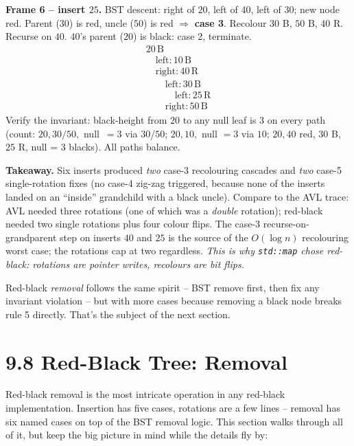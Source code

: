 \documentclass[11pt]{article}
\begin{document}
\begin{examplebox}
\textbf{Frame 6 -- insert $25$.} BST descent: right of $20$, left
of $40$, left of $30$; new node red. Parent ($30$) is red, uncle
($50$) is red $\Rightarrow$ \textbf{case 3}. Recolour $30$ B,
$50$ B, $40$ R. Recurse on $40$. $40$'s parent ($20$) is black:
case 2, terminate.
\[
\begin{array}{l}
20\,\text{B} \\
\quad \text{left}: 10\,\text{B} \\
\quad \text{right}: 40\,\text{R} \\
\qquad \text{left}: 30\,\text{B} \\
\qquad\quad \text{left}: 25\,\text{R} \\
\qquad \text{right}: 50\,\text{B}
\end{array}
\]
Verify the invariant: black-height from $20$ to any null leaf is
$3$ on every path (count: $20, 30/50, $ null $\,= 3$ via
$30$/$50$; $20, 10, $ null $ = 3$ via $10$; $20, 40$ red, $30$ B,
$25$ R, null = $3$ blacks). All paths balance.

\textbf{Takeaway.} Six inserts produced \emph{two} case-3
recolouring cascades and \emph{two} case-5 single-rotation fixes
(no case-4 zig-zag triggered, because none of the inserts landed
on an ``inside'' grandchild with a black uncle). Compare to the
AVL trace: AVL needed three rotations (one of which was a
\emph{double} rotation); red-black needed two single rotations
plus four colour flips. The case-3 recurse-on-grandparent step on
inserts $40$ and $25$ is the source of the $O(\log n)$ recolouring
worst case; the rotations cap at two regardless. \emph{This is
why \texttt{std::map} chose red-black: rotations are pointer
writes, recolours are bit flips.}
\end{examplebox}

\begin{notebox}
Red-black \emph{removal} follows the same spirit -- BST remove first, then fix any invariant violation -- but with more cases because removing a black node breaks rule 5 directly. That's the subject of the next section.
\end{notebox}

\section{9.8 Red-Black Tree: Removal}

Red-black removal is the most intricate operation in any red-black implementation. Insertion has five cases, rotations are a few lines -- removal has six named cases on top of the BST removal logic. This section walks through all of it, but keep the big picture in mind while the details fly by:
\end{document}
